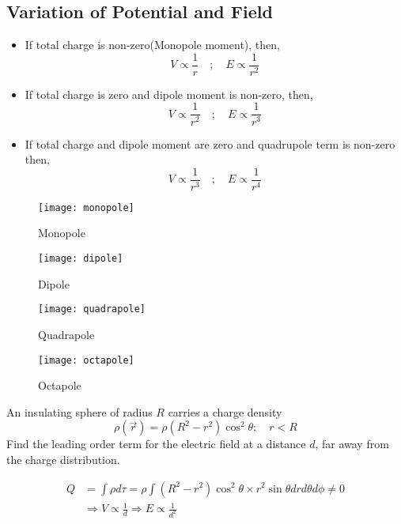 \subsection{Variation of Potential and Field}
\begin{itemize}
	\item If total charge is non-zero(Monopole moment), then, $$V \propto \frac{1}{r}\quad ;\quad E \propto \frac{1}{r^{2}}$$
	\item If total charge is zero and dipole moment is non-zero, then, $$V \propto \frac{1}{r^{2}}\quad ;\quad E \propto \frac{1}{r^{3}}$$
	\item If total charge and dipole moment are zero and quadrupole term is non-zero then, $$V \propto \frac{1}{r^{3}}\quad ;\quad E \propto \frac{1}{r^{4}}$$
\end{itemize}
\begin{figure}[H]
	\begin{minipage}{0.24\textwidth}
		\texttt{[image: monopole]}
		\caption{Monopole}
	\end{minipage}
	\begin{minipage}{0.24\textwidth}
	\texttt{[image: dipole]}
		\caption{Dipole}
	\end{minipage}
\begin{minipage}{0.24\textwidth}
\texttt{[image: quadrapole]}
	\caption{Quadrapole}
\end{minipage}
\begin{minipage}{0.24\textwidth}
\texttt{[image: octapole]}
\caption{Octapole}
\end{minipage}
\end{figure}
\begin{exercise}
	An insulating sphere of radius $R$ carries a charge density
	$$
	\rho(\vec{r})=\rho\left(R^{2}-r^{2}\right) \cos ^{2} \theta ; \quad r<R
	$$
	Find the leading order term for the electric field at a distance $d$, far away from the charge
	distribution.
\end{exercise}
\begin{answer}
	\begin{align*}
	Q&=\int \rho d \tau=\rho \int\left(R^{2}-r^{2}\right) \cos ^{2} \theta \times r^{2} \sin \theta d r d \theta d \phi \neq 0 \\ &\Rightarrow V \propto \frac{1}{d} \Rightarrow E \propto \frac{1}{d^{2}}
	\end{align*}
	
\end{answer}
